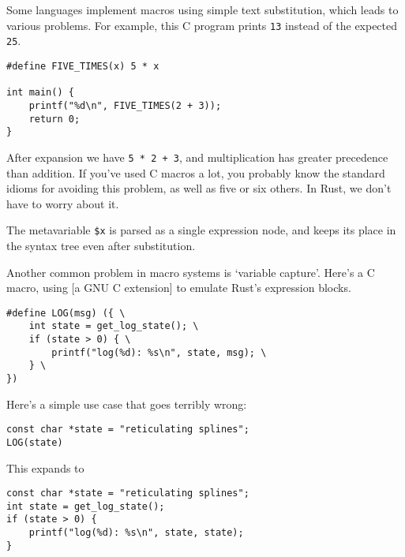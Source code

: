 \documentclass[a4paper,]{book}
\newenvironment{Shaded}{\begin{snugshade}}{\end{snugshade}}
\newcommand{\KeywordTok}[1]{\textcolor[rgb]{0.13,0.29,0.53}{\textbf{{#1}}}}
\newcommand{\DecValTok}[1]{\textcolor[rgb]{0.00,0.00,0.81}{{#1}}}
\newcommand{\OtherTok}[1]{\textcolor[rgb]{0.56,0.35,0.01}{{#1}}}
\newcommand{\NormalTok}[1]{{#1}}
\begin{document}
Some languages implement macros using simple text substitution, which
leads to various problems. For example, this C program prints
\texttt{13} instead of the expected \texttt{25}.

\begin{verbatim}
#define FIVE_TIMES(x) 5 * x

int main() {
    printf("%d\n", FIVE_TIMES(2 + 3));
    return 0;
}
\end{verbatim}

After expansion we have \texttt{5\ *\ 2\ +\ 3}, and multiplication has
greater precedence than addition. If you've used C macros a lot, you
probably know the standard idioms for avoiding this problem, as well as
five or six others. In Rust, we don't have to worry about it.

\begin{Shaded}
\end{Shaded}

The metavariable \texttt{\$x} is parsed as a single expression node, and
keeps its place in the syntax tree even after substitution.

Another common problem in macro systems is `variable capture'. Here's a
C macro, using {[}a GNU C extension{]} to emulate Rust's expression
blocks.

\begin{verbatim}
#define LOG(msg) ({ \
    int state = get_log_state(); \
    if (state > 0) { \
        printf("log(%d): %s\n", state, msg); \
    } \
})
\end{verbatim}

Here's a simple use case that goes terribly wrong:

\begin{verbatim}
const char *state = "reticulating splines";
LOG(state)
\end{verbatim}

This expands to

\begin{verbatim}
const char *state = "reticulating splines";
int state = get_log_state();
if (state > 0) {
    printf("log(%d): %s\n", state, state);
}
\end{verbatim}
\end{document}
